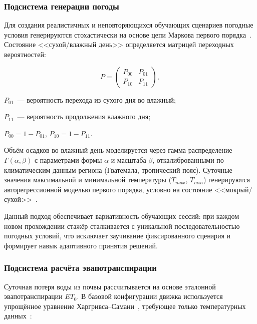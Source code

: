 \subsubsection{Подсистема генерации погоды}

Для создания реалистичных и неповторяющихся обучающих сценариев
погодные условия генерируются стохастически на основе цепи Маркова
первого порядка~\cite{richardson1981_weather,semenov1998_larswg}.
Состояние <<сухой/влажный день>> определяется матрицей переходных
вероятностей:

\begin{equation}
	P = \begin{pmatrix} P_{00} & P_{01} \\ P_{10} & P_{11} \end{pmatrix},
	\label{eq:markov_weather}
\end{equation}

\begin{where}
	\item $P_{01}$~--- вероятность перехода из сухого дня во влажный;
	\item $P_{11}$~--- вероятность продолжения влажного дня;
	\item $P_{00} = 1 - P_{01}$, $P_{10} = 1 - P_{11}$.
\end{where}

Объём осадков во влажный день моделируется через гамма-рас\-пре\-де\-ле\-ние
$\Gamma(\alpha, \beta)$ с параметрами формы $\alpha$ и масштаба
$\beta$, откалиброванными по климатическим данным региона
(Гватемала, тропический пояс). Суточные значения максимальной
и минимальной температуры ($T_{max}$, $T_{min}$) генерируются
авторегрессионной моделью первого порядка, условно на состояние
<<мокрый/сухой>>~\cite{chen2012_weagets,chen2020_markov_bias}.

Данный подход обеспечивает вариативность обучающих сессий: при
каждом новом прохождении стажёр сталкивается с уникальной
последовательностью погодных условий, что исключает заучивание
фиксированного сценария и формирует навык адаптивного принятия
решений.

\subsubsection{Подсистема расчёта эвапотранспирации}

Суточная потеря воды из почвы рассчитывается на основе эталонной
эвапотранспирации $ET_0$. В базовой конфигурации движка используется
упрощённое уравнение Харгривса--Самани~\cite{hargreaves2003_history},
требующее только температурных
данных~\cite{aschonitis2017_modified_hargreaves}:

